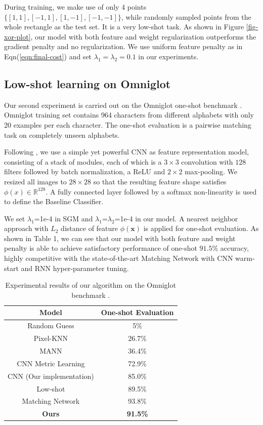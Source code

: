 During training, we make use of only 4 points $\{[1,1],[-1,1],[1,-1],[-1,-1]\}$, while randomly sampled points from the whole rectangle as the test set. It is a very low-shot task. As shown in Figure \ref{fig-xor-plot}, our model with both feature and weight regularization outperforms the gradient penalty \cite{low-shot} and no regularization. We use uniform feature penalty as in Eqn(\ref{eqn:final-cost}) and set $\lambda_1=\lambda_2=0.1$ in our experiments.

\subsection{Low-shot learning on Omniglot}
Our second experiment is carried out on the Omniglot one-shot benchmark \cite{lake-omniglot}. Omniglot training set contains 964 characters from different alphabets with only 20 examples per each character. The one-shot evaluation is a pairwise matching task on completely unseen alphabets.

Following \cite{matching-network}, we use a simple yet powerful CNN as feature representation model, consisting of a stack of modules, each of which is a $3\times3$ convolution with $128$ filters followed by batch normalization\cite{batch-normalization}, a ReLU and $2\times2$ max-pooling. We resized all images to $28 \times28$ so that the resulting feature shape satisfies $\phi(x)\in\mathbb{R}^{128}$. A fully connected layer followed by a softmax non-linearity is used to define the Baseline Classifier.

We set $\lambda_1$=1e-4 in SGM \cite{low-shot} and $\lambda_1$=$\lambda_2$=1e-4 in our model. A nearest neighbor approach with $L_2$ distance of feature $\phi(\mathbf{x})$ is applied for one-shot evaluation. As shown in Table 1, we can see that our model with both feature and weight penalty is able to achieve satisfactory performance of one-shot $91.5\%$ accuracy, highly competitive with the state-of-the-art Matching Network\cite{matching-network} with CNN warm-start and RNN hyper-parameter tuning.

\begin{table}
\center
\begin{small}
	\renewcommand{\arraystretch}{1.1}
	\begin{tabular}{c|c}
	\hline
	Model & One-shot Evaluation \\
	\hline
	Random Guess & 5\%\\
	Pixel-KNN & 26.7\%\\
	MANN \cite{mann} & 36.4\%\\
	CNN Metric Learning & 72.9\% \\
	\hline
	CNN (Our implementation) & 85.0\% \\
	Low-shot \cite{low-shot} & 89.5\% \\
	{\color{red} Matching Network \cite{matching-network}} & {\color{red}93.8\%} \\
	\textbf{Ours} & \textbf{91.5\%}\\
	\hline
	\end{tabular}
	\caption{Experimental results of our algorithm on the Omniglot benchmark \cite{lake-omniglot}. }
	\end{small}
\label{tab:omniglot}
\end{table}

